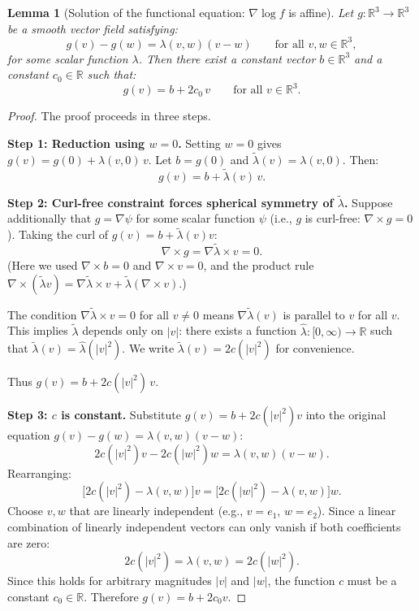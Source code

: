 \documentclass[11pt]{article}
\newcommand{\R}{\mathbb{R}}
\newtheorem{lemma}[theorem]{Lemma}
\begin{document}
\begin{lemma}[Solution of the functional equation: $\nabla \log f$ is affine]
\label{lem:functional_eq_solution}
Let $g : \R^3 \to \R^3$ be a smooth vector field satisfying:
\[
g(v) - g(w) = \lambda(v, w)(v - w) \qquad \text{for all } v, w \in \R^3,
\]
for some scalar function $\lambda$. Then there exist a constant vector $b \in \R^3$ and a constant $c_0 \in \R$ such that:
\[
g(v) = b + 2c_0 \, v \qquad \text{for all } v \in \R^3.
\]
\end{lemma}

\begin{proof}
The proof proceeds in three steps.

\textbf{Step 1: Reduction using $w = 0$.}
Setting $w = 0$ gives $g(v) = g(0) + \lambda(v, 0) \, v$. Let $b = g(0)$ and $\tilde{\lambda}(v) = \lambda(v, 0)$. Then:
\[
g(v) = b + \tilde{\lambda}(v) \, v.
\]

\textbf{Step 2: Curl-free constraint forces spherical symmetry of $\tilde{\lambda}$.}
Suppose additionally that $g = \nabla \psi$ for some scalar function $\psi$ (i.e., $g$ is curl-free: $\nabla \times g = 0$). Taking the curl of $g(v) = b + \tilde{\lambda}(v) v$:
\[
\nabla \times g = \nabla \tilde{\lambda} \times v = 0.
\]
(Here we used $\nabla \times b = 0$ and $\nabla \times v = 0$, and the product rule $\nabla \times (\tilde{\lambda} v) = \nabla \tilde{\lambda} \times v + \tilde{\lambda} (\nabla \times v)$.)

The condition $\nabla \tilde{\lambda} \times v = 0$ for all $v \neq 0$ means $\nabla \tilde{\lambda}(v)$ is parallel to $v$ for all $v$. This implies $\tilde{\lambda}$ depends only on $|v|$: there exists a function $\hat{\lambda} : [0, \infty) \to \R$ such that $\tilde{\lambda}(v) = \hat{\lambda}(|v|^2)$. We write $\tilde{\lambda}(v) = 2c(|v|^2)$ for convenience.

Thus $g(v) = b + 2c(|v|^2) \, v$.

\textbf{Step 3: $c$ is constant.}
Substitute $g(v) = b + 2c(|v|^2) v$ into the original equation $g(v) - g(w) = \lambda(v,w)(v - w)$:
\[
2c(|v|^2) v - 2c(|w|^2) w = \lambda(v,w)(v - w).
\]
Rearranging:
\[
\big[2c(|v|^2) - \lambda(v,w)\big] v = \big[2c(|w|^2) - \lambda(v,w)\big] w.
\]
Choose $v, w$ that are linearly independent (e.g., $v = e_1$, $w = e_2$). Since a linear combination of linearly independent vectors can only vanish if both coefficients are zero:
\[
2c(|v|^2) = \lambda(v,w) = 2c(|w|^2).
\]
Since this holds for arbitrary magnitudes $|v|$ and $|w|$, the function $c$ must be a constant $c_0 \in \R$. Therefore $g(v) = b + 2c_0 v$.
\end{proof}
\end{document}
